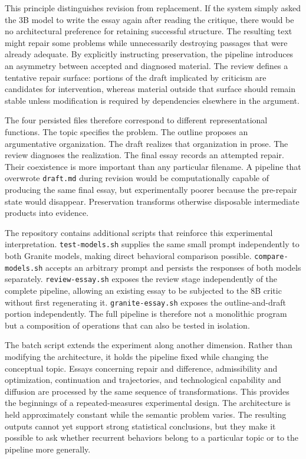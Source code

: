 \documentclass[11pt]{article}
\begin{document}
This principle distinguishes revision from replacement. If the system simply asked the 3B model to write the essay again after reading the critique, there would be no architectural preference for retaining successful structure. The resulting text might repair some problems while unnecessarily destroying passages that were already adequate. By explicitly instructing preservation, the pipeline introduces an asymmetry between accepted and diagnosed material. The review defines a tentative repair surface: portions of the draft implicated by criticism are candidates for intervention, whereas material outside that surface should remain stable unless modification is required by dependencies elsewhere in the argument.

The four persisted files therefore correspond to different representational functions. The topic specifies the problem. The outline proposes an argumentative organization. The draft realizes that organization in prose. The review diagnoses the realization. The final essay records an attempted repair. Their coexistence is more important than any particular filename. A pipeline that overwrote \texttt{draft.md} during revision would be computationally capable of producing the same final essay, but experimentally poorer because the pre-repair state would disappear. Preservation transforms otherwise disposable intermediate products into evidence.

The repository contains additional scripts that reinforce this experimental interpretation. \texttt{test-models.sh} supplies the same small prompt independently to both Granite models, making direct behavioral comparison possible. \texttt{compare-models.sh} accepts an arbitrary prompt and persists the responses of both models separately. \texttt{review-essay.sh} exposes the review stage independently of the complete pipeline, allowing an existing essay to be subjected to the 8B critic without first regenerating it. \texttt{granite-essay.sh} exposes the outline-and-draft portion independently. The full pipeline is therefore not a monolithic program but a composition of operations that can also be tested in isolation.

The batch script extends the experiment along another dimension. Rather than modifying the architecture, it holds the pipeline fixed while changing the conceptual topic. Essays concerning repair and difference, admissibility and optimization, continuation and trajectories, and technological capability and diffusion are processed by the same sequence of transformations. This provides the beginnings of a repeated-measures experimental design. The architecture is held approximately constant while the semantic problem varies. The resulting outputs cannot yet support strong statistical conclusions, but they make it possible to ask whether recurrent behaviors belong to a particular topic or to the pipeline more generally.
\end{document}
